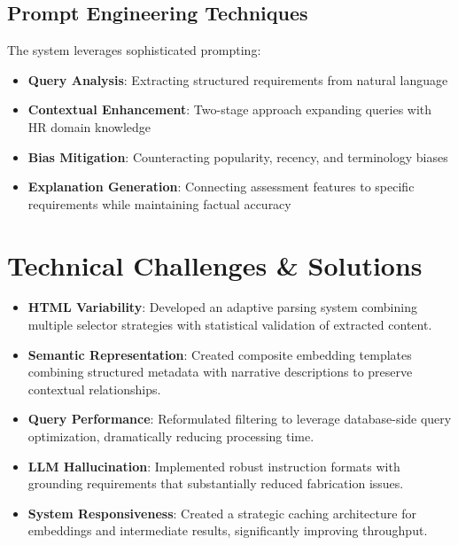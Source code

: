 \documentclass[9pt,a4paper,twocolumn]{article}
\begin{document}
\subsection{\fontsize{8.5}{10}\selectfont Prompt Engineering Techniques}
The system leverages sophisticated prompting:
\begin{itemize}
    \item \textbf{Query Analysis}: Extracting structured requirements from natural language
    \item \textbf{Contextual Enhancement}: Two-stage approach expanding queries with HR domain knowledge
    \item \textbf{Bias Mitigation}: Counteracting popularity, recency, and terminology biases
    \item \textbf{Explanation Generation}: Connecting assessment features to specific requirements while maintaining factual accuracy
\end{itemize}

\section{\fontsize{9}{11}\selectfont Technical Challenges \& Solutions}
\fontsize{8}{10}\selectfont
\begin{itemize}
    \item \textbf{HTML Variability}: Developed an adaptive parsing system combining multiple selector strategies with statistical validation of extracted content.
    
    \item \textbf{Semantic Representation}: Created composite embedding templates combining structured metadata with narrative descriptions to preserve contextual relationships.
    
    \item \textbf{Query Performance}: Reformulated filtering to leverage database-side query optimization, dramatically reducing processing time.
    
    \item \textbf{LLM Hallucination}: Implemented robust instruction formats with grounding requirements that substantially reduced fabrication issues.
    
    \item \textbf{System Responsiveness}: Created a strategic caching architecture for embeddings and intermediate results, significantly improving throughput.
\end{itemize}
\end{document}
